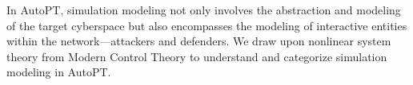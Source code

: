 


In AutoPT, simulation modeling not only involves the abstraction and modeling of the target cyberspace but also encompasses the modeling of interactive entities within the network—attackers and defenders. We draw upon nonlinear system theory from Modern Control Theory to understand and categorize simulation modeling in AutoPT.

